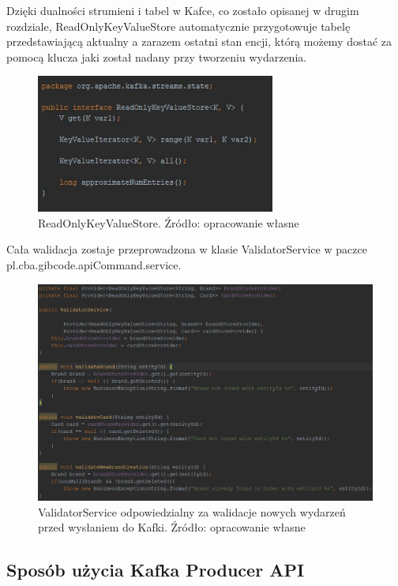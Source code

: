 Dzięki dualności strumieni i tabel w Kafce, co zostało opisanej w drugim rozdziale, ReadOnlyKeyValueStore automatycznie przygotowuje tabelę przedstawiającą aktualny a zarazem ostatni stan encji, którą możemy dostać za pomocą klucza jaki został nadany przy tworzeniu wydarzenia.

\begin{figure}[h!]
  \centering
    \includegraphics[width=0.7\textwidth]{images/ReadOnlyKeyValueStore.JPG}
  \caption{ReadOnlyKeyValueStore. Źródło: opracowanie własne }
\end{figure}
\FloatBarrier

Cała walidacja zostaje przeprowadzona w klasie ValidatorService w paczce  pl.cba.gibcode.apiCommand.service.
\begin{figure}[h!]
  \centering
    \includegraphics[width=1.0\textwidth]{images/ValidatorService.JPG}
  \caption{ValidatorService odpowiedzialny za walidacje nowych wydarzeń przed wysłaniem do Kafki. Źródło: opracowanie własne }
\end{figure}
\FloatBarrier

\subsection{Sposób użycia Kafka Producer API}


